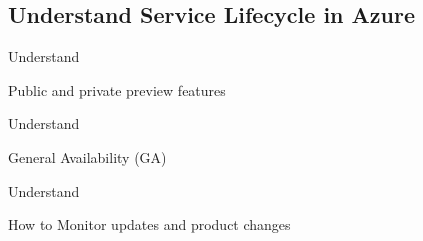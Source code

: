 \documentclass{scrartcl}
\newenvironment{flashcard}[2][]{%
    #1
    \vfill
    \centerline{\Large{#2}}
    \vfill
    \newpage
}
{\newpage}
\newcommand{\subsectioncard}[1]{
    \vspace*{\stretch{1}}
    \subsection{#1}
    \vspace*{\stretch{1}}
    \pagebreak
}
\begin{document}
    \subsectioncard{Understand Service Lifecycle in Azure}

    \begin{flashcard}[Understand]{Public and private preview features}

    \end{flashcard}

    \begin{flashcard}[Understand]{General Availability (GA)}

    \end{flashcard}

    \begin{flashcard}[Understand]{How to Monitor updates and product changes}

    \end{flashcard}

    \doclicenseThis
    \pagebreak
\end{document}
